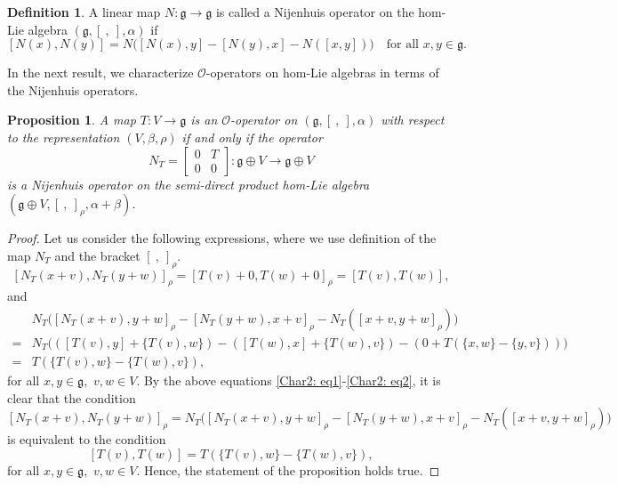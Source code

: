 \documentclass[a4paper,11pt]{amsart}
\theoremstyle{plain}
\newtheorem{proposition}[theorem]{Proposition}
\theoremstyle{definition}
\newtheorem{definition}[theorem]{Definition}
\theoremstyle{remark}
\numberwithin{equation}{section}
\begin{document}
\begin{definition}
A linear map $N:\mathfrak{g}\rightarrow \mathfrak{g}$ is called a Nijenhuis operator on the hom-Lie algebra $(\mathfrak{g},[~,~],\alpha)$ if
$$[N(x),N(y)]=N\big([N(x),y]-[N(y),x]-N([x,y])\big)\quad \mbox{for all }x,y\in \mathfrak{g}.$$
\end{definition}

In the next result, we characterize $\mathcal{O}$-operators on hom-Lie algebras in terms of the Nijenhuis operators.
\begin{proposition}
A map $T:V\rightarrow \mathfrak{g}$ is an $\mathcal{O}$-operator on $(\mathfrak{g},[~,~],\alpha)$ with respect to the representation $(V,\beta,\rho)$ if and only if the operator 
$$N_T=\begin{bmatrix}
   0 & T \\
    0  & 0
\end{bmatrix}: \mathfrak{g}\oplus V\rightarrow \mathfrak{g}\oplus V $$  
is a Nijenhuis operator on the semi-direct product hom-Lie algebra $(\mathfrak{g}\oplus V,[~,~]_{\rho},\alpha+\beta)$.
\end{proposition}
\begin{proof} Let us consider the following expressions, where we use definition of the map $N_T$ and the bracket $[~,~]_{\rho}$. 
\begin{equation}\label{Char2: eq1}
[N_T(x+v),N_T(y+w)]_{\rho}= [T(v)+0,T(w)+0]_{\rho}=[T(v),T(w)], 
\end{equation}
and
\begin{align}\label{Char2: eq2}
\nonumber
&N_T\big([N_T(x+v),y+w]_{\rho}-[N_T(y+w),x+v]_{\rho}-N_T([x+v,y+w]_{\rho})\big)\\\nonumber
=&N_T \big(([T(v),y]+\{T(v),w\})-([T(w),x]+\{T(w),v\})-(0+T(\{x,w\}-\{y,v\}))\big)\\
=& T(\{T(v),w\}-\{T(w),v\}),
\end{align}
for all $x,y\in\mathfrak{g},$ $v,w\in V$. By the above equations \eqref{Char2: eq1}-\eqref{Char2: eq2}, it is clear that the condition  
$$[N_T(x+v),N_T(y+w)]_{\rho}=N_T\big([N_T(x+v),y+w]_{\rho}-[N_T(y+w),x+v]_{\rho}-N_T([x+v,y+w]_{\rho})\big)$$
is equivalent to the condition
$$[T(v),T(w)]=T(\{T(v),w\}-\{T(w),v\}),$$
for all $x,y\in\mathfrak{g},$ $v,w\in V$. Hence, the statement of the proposition holds true.
\end{proof}
\end{document}
